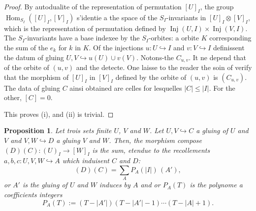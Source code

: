 \documentclass[11pt,a4paper]{article}
\theoremstyle{plain}
\newtheorem{proposition}[theorem]{Proposition}
\theoremstyle{definition}
\DeclareMathOperator{\Hom}{Hom}
\DeclareMathOperator{\Inj}{Inj}
\newcommand{\inj}{\hookrightarrow}
\begin{document}
\begin{proof}
By autodualite of the representation of permutation $[U]_I$, the group $\Hom_{S_I}([U]_I, [V]_I)$ s'identie a the space of the $S_I$-invariants in $[U]_I \otimes [V]_I$, which is the representation of permutation defined by $\Inj(U, I) \times \Inj(V, I)$. The $S_I$-invariants have a base indexee by the $S_I$-orbites: a orbite $K$ corresponding the sum of the $e_k$ for $k$ in $K$. Of the injections $u : U \inj I$ and $v : V \inj I$ definissent the datum of gluing $U, V \inj u(U) \cup v(V)$. Notons-the $C_{u,v}$. It ne depend that of the orbite of $(u, v)$ and the detecte. One laisse to the reader the soin of verify that the morphism of $[U]_I$ in $[V]_I$ defined by the orbite of $(u, v)$ is $(C_{u,v})$. The data of gluing $C$ ainsi obtained are celles for lesquelles $|C| \leq |I|$. For the other, $[C] = 0$.

This proves (i), and (ii) is trivial.
\end{proof}

\begin{proposition}
Let trois sets finite $U$, $V$ and $W$. Let $U, V \inj C$ a gluing of $U$ and $V$ and $V, W \inj D$ a gluing $V$ and $W$. Then, the morphism compose $(D)(C) : (U)_I \to [W]_I$ is the sum, etendue to the recollements $a, b, c : U, V, W \inj A$ which induisent $C$ and $D$:
\begin{equation}
(D)(C) = \sum_A P_A(|I|)\,(A'), \tag{2.10.1}
\end{equation}
or $A'$ is the gluing of $U$ and $W$ induces by $A$ and or $P_A(T)$ is the polynome a coefficients integers
\begin{equation}
P_A(T) := (T - |A'|)(T - |A'| - 1) \cdots (T - |A| + 1). \tag{2.10.2}
\end{equation}
\end{proposition}
\end{document}
